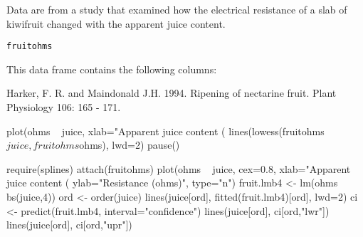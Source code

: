 \begin{Description}\relax
Data are from a study that examined how the electrical
resistance of a slab of kiwifruit changed with the apparent
juice content.
\end{Description}
\begin{Usage}
\begin{verbatim}fruitohms\end{verbatim}
\end{Usage}
\begin{Format}\relax
This data frame contains the following columns:
\end{Format}
\begin{Source}\relax
Harker, F. R. and Maindonald J.H. 1994. Ripening of nectarine
fruit. Plant Physiology 106: 165 - 171.
\end{Source}
\begin{Examples}
\begin{ExampleCode}
plot(ohms ~ juice, xlab="Apparent juice content (%
lines(lowess(fruitohms$juice, fruitohms$ohms), lwd=2)
pause()

require(splines)
attach(fruitohms)
plot(ohms ~ juice, cex=0.8, xlab="Apparent juice content (%
     ylab="Resistance (ohms)", type="n")
fruit.lmb4 <- lm(ohms ~ bs(juice,4))
ord <- order(juice)
lines(juice[ord], fitted(fruit.lmb4)[ord], lwd=2)
ci <- predict(fruit.lmb4, interval="confidence")
lines(juice[ord], ci[ord,"lwr"])
lines(juice[ord], ci[ord,"upr"])
\end{ExampleCode}
\end{Examples}

